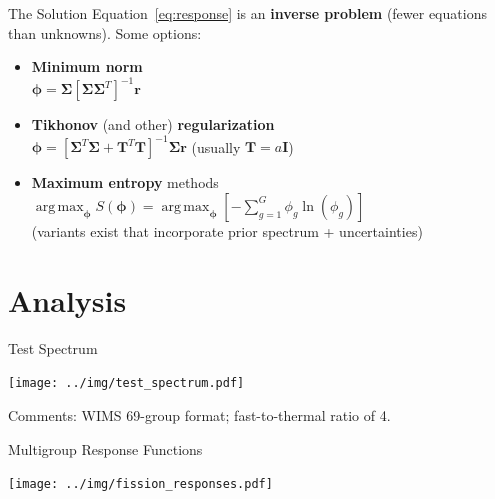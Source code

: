 \documentclass[fleqn]{beamer}
\begin{document}
    
    \begin{frame}{The Solution}
      Equation~\ref{eq:response} is an {\bf inverse problem} (fewer equations than unknowns). 
      \vfill
      Some options: 
      \begin{itemize}
       \item {\bf Minimum norm} \\
             $\bm{\phi} =  \bm{\Sigma}  [\bm{\Sigma} \bm{\Sigma}^T]^{-1}\mathbf{r}$
       \item {\bf Tikhonov} (and other) {\bf regularization} \\
             $\bm{\phi} = [\bm{\Sigma}^T \bm{\Sigma}+ \mathbf{T}^T \mathbf{T}]^{-1} \bm{\Sigma} \mathbf{r}$ (usually $\mathbf{T} = a\mathbf{I}$)
       \item {\bf Maximum entropy} methods
             $\operatorname*{arg\,max}_{\bm{\phi}} S(\bm{\phi}) = 
                \operatorname*{arg\,max}_{\bm{\phi}} \left [ -\sum^G_{g=1} \phi_g \ln(\phi_g) \right ]$ \\
             (variants exist that incorporate prior spectrum + uncertainties)
      \end{itemize}
    \end{frame}
    
    \section{Analysis}
    
    \begin{frame}{Test Spectrum}
         \begin{center}
             \texttt{[image: ../img/test\_spectrum.pdf]}
         \end{center}
         Comments: WIMS 69-group format; fast-to-thermal ratio of 4.
    \end{frame}
    
    \begin{frame}{Multigroup Response Functions}
         \begin{center}
             \texttt{[image: ../img/fission\_responses.pdf]}
         \end{center}
    \end{frame}
\end{document}
